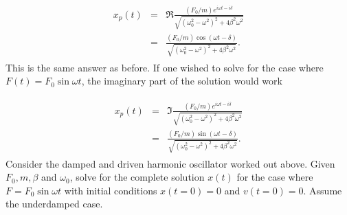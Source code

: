 \documentclass[letterpaper,10pt,english]{sphinxmanual}
\begin{document}
\begin{equation*}
\begin{split}
\begin{eqnarray}
\label{eq:fastdriven1} \tag{66}
x_p(t)&=&\Re\frac{(F_0/m)e^{i\omega t-i\delta}}{\sqrt{(\omega_0^2-\omega^2)^2+4\beta^2\omega^2}}\\
\nonumber
&=&\frac{(F_0/m)\cos(\omega t-\delta)}{\sqrt{(\omega_0^2-\omega^2)^2+4\beta^2\omega^2}}.
\end{eqnarray}
\end{split}
\end{equation*}
This is the same answer as before.
If one wished to solve for the case where \(F(t)= F_0\sin\omega t\), the imaginary part of the solution would work




\begin{equation*}
\begin{split}
\begin{eqnarray}
\label{eq:fastdriven2} \tag{67}
x_p(t)&=&\Im\frac{(F_0/m)e^{i\omega t-i\delta}}{\sqrt{(\omega_0^2-\omega^2)^2+4\beta^2\omega^2}}\\
\nonumber
&=&\frac{(F_0/m)\sin(\omega t-\delta)}{\sqrt{(\omega_0^2-\omega^2)^2+4\beta^2\omega^2}}.
\end{eqnarray}
\end{split}
\end{equation*}
Consider the damped and driven harmonic oscillator worked out above. Given \(F_0, m,\beta\) and \(\omega_0\), solve for the complete solution \(x(t)\) for the case where \(F=F_0\sin\omega t\) with initial conditions \(x(t=0)=0\) and \(v(t=0)=0\). Assume the underdamped case.
\end{document}
